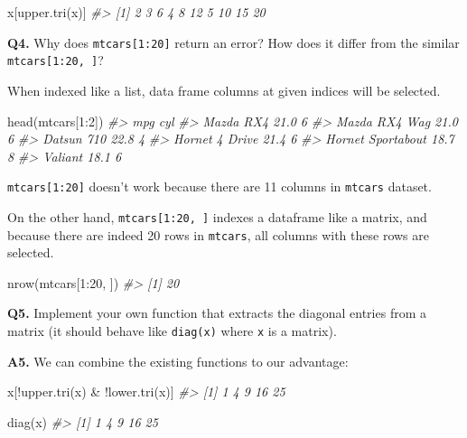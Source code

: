 \documentclass[
]{book}
\newenvironment{Shaded}{\begin{snugshade}}{\end{snugshade}}
\newcommand{\CommentTok}[1]{\textcolor[rgb]{0.56,0.35,0.01}{\textit{#1}}}
\newcommand{\DecValTok}[1]{\textcolor[rgb]{0.00,0.00,0.81}{#1}}
\newcommand{\FunctionTok}[1]{\textcolor[rgb]{0.00,0.00,0.00}{#1}}
\newcommand{\NormalTok}[1]{#1}
\newcommand{\SpecialCharTok}[1]{\textcolor[rgb]{0.00,0.00,0.00}{#1}}
\begin{document}
\begin{Shaded}
\begin{Highlighting}[]
\NormalTok{x[}\FunctionTok{upper.tri}\NormalTok{(x)]}
\CommentTok{\#\textgreater{}  [1]  2  3  6  4  8 12  5 10 15 20}
\end{Highlighting}
\end{Shaded}

\textbf{Q4.} Why does \texttt{mtcars{[}1:20{]}} return an error? How does it differ from the similar \texttt{mtcars{[}1:20,\ {]}}?

When indexed like a list, data frame columns at given indices will be selected.

\begin{Shaded}
\begin{Highlighting}[]
\FunctionTok{head}\NormalTok{(mtcars[}\DecValTok{1}\SpecialCharTok{:}\DecValTok{2}\NormalTok{])}
\CommentTok{\#\textgreater{}                    mpg cyl}
\CommentTok{\#\textgreater{} Mazda RX4         21.0   6}
\CommentTok{\#\textgreater{} Mazda RX4 Wag     21.0   6}
\CommentTok{\#\textgreater{} Datsun 710        22.8   4}
\CommentTok{\#\textgreater{} Hornet 4 Drive    21.4   6}
\CommentTok{\#\textgreater{} Hornet Sportabout 18.7   8}
\CommentTok{\#\textgreater{} Valiant           18.1   6}
\end{Highlighting}
\end{Shaded}

\texttt{mtcars{[}1:20{]}} doesn't work because there are 11 columns in \texttt{mtcars} dataset.

On the other hand, \texttt{mtcars{[}1:20,\ {]}} indexes a dataframe like a matrix, and because there are indeed 20 rows in \texttt{mtcars}, all columns with these rows are selected.

\begin{Shaded}
\begin{Highlighting}[]
\FunctionTok{nrow}\NormalTok{(mtcars[}\DecValTok{1}\SpecialCharTok{:}\DecValTok{20}\NormalTok{, ])}
\CommentTok{\#\textgreater{} [1] 20}
\end{Highlighting}
\end{Shaded}

\textbf{Q5.} Implement your own function that extracts the diagonal entries from a matrix (it should behave like \texttt{diag(x)} where \texttt{x} is a matrix).

\textbf{A5.} We can combine the existing functions to our advantage:

\begin{Shaded}
\begin{Highlighting}[]
\NormalTok{x[}\SpecialCharTok{!}\FunctionTok{upper.tri}\NormalTok{(x) }\SpecialCharTok{\&} \SpecialCharTok{!}\FunctionTok{lower.tri}\NormalTok{(x)]}
\CommentTok{\#\textgreater{} [1]  1  4  9 16 25}

\FunctionTok{diag}\NormalTok{(x)}
\CommentTok{\#\textgreater{} [1]  1  4  9 16 25}
\end{Highlighting}
\end{Shaded}
\end{document}
